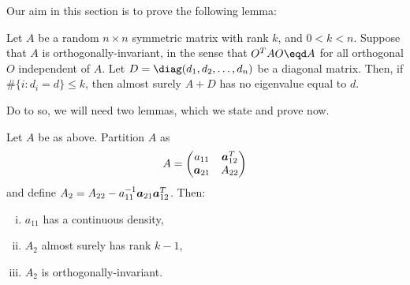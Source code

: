 Our aim in this section is to prove the following lemma:

\begin{lemma}\label{L:lowrank-perturb}
    Let $A$ be a random $n\times n$ symmetric matrix with rank $k$, and
    $0 < k < n$.  Suppose that $A$ is orthogonally-invariant, in the sense that 
    $O^T A O \eqd A$ for all orthogonal $O$ independent of $A$.  Let
    $D = \diag(d_1, d_2, \ldots, d_n)$ be a diagonal matrix.  Then, if
    $\#\{ i : d_i = d \} \leq k$, then almost surely $A + D$ has no eigenvalue
    equal to $d$.
\end{lemma}

\noindent Do to so, we will need two lemmas, which we state and prove now.

\begin{lemma}
    Let $A$ be as above.  Partition $A$ as 
    \[
        A
        =
        \left(
        \begin{matrix}
            a_{11}   & \boldsymbol{a}_{12}^T \\
            \boldsymbol{a}_{21} & A_{22}
        \end{matrix}
        \right)
    \]
    and define $A_2 = A_{22} - a_{11}^{-1} \boldsymbol{a}_{21} \boldsymbol{a}_{12}^T$.  Then:
    \begin{enumerate}[(i)]
        \item $a_{11}$ has a continuous density,
        \item $A_2$ almost surely has rank $k-1$,
        \item $A_2$ is orthogonally-invariant.
    \end{enumerate}
\end{lemma}
